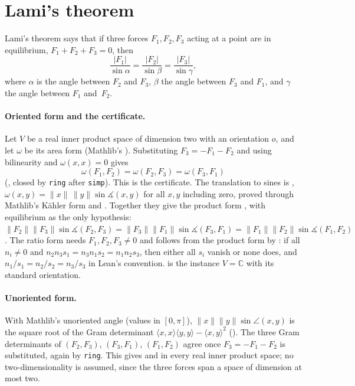 \documentclass[11pt]{article}
\theoremstyle{definition}
\theoremstyle{remark}
\newcommand{\lean}[1]{\texttt{#1}}
\newcommand{\CC}{\mathbb{C}}
\begin{document}
\section{Lami's theorem}\label{sec:lami}

Lami's theorem says that if three forces $F_1,F_2,F_3$ acting at a point are in equilibrium,
$F_1+F_2+F_3=0$, then
\[
\frac{|F_1|}{\sin\alpha}=\frac{|F_2|}{\sin\beta}=\frac{|F_3|}{\sin\gamma},
\]
where $\alpha$ is the angle between $F_2$ and $F_3$, $\beta$ the angle between $F_3$ and $F_1$, and
$\gamma$ the angle between $F_1$ and~$F_2$.

\paragraph{Oriented form and the certificate.} Let $V$ be a real inner product space of dimension
two with an orientation $o$, and let $\omega$ be its area form (Mathlib's
). Substituting $F_3=-F_1-F_2$ and using bilinearity and
$\omega(x,x)=0$ gives
\begin{equation}\label{eq:lami}
\omega(F_1,F_2)=\omega(F_2,F_3)=\omega(F_3,F_1)
\end{equation}
(, closed by \lean{ring} after \lean{simp}). This is the certificate.
The translation to sines is ,
$\omega(x,y)=\|x\|\,\|y\|\sin\measuredangle(x,y)$ for all $x,y$ including zero, proved through
Mathlib's K\"ahler form and . Together they give the product form
, with equilibrium as the only hypothesis:
$\|F_2\|\|F_3\|\sin\measuredangle(F_2,F_3)=\|F_3\|\|F_1\|\sin\measuredangle(F_3,F_1)=\|F_1\|\|F_2\|\sin\measuredangle(F_1,F_2)$.
The ratio form  needs $F_1,F_2,F_3\ne0$ and follows from the product
form by : if all $n_i\ne0$ and
$n_2n_3s_1=n_3n_1s_2=n_1n_2s_3$, then either all $s_i$ vanish or none does, and
$n_1/s_1=n_2/s_2=n_3/s_3$ in Lean's convention.  is the instance
$V=\CC$ with its standard orientation.

\paragraph{Unoriented form.} With Mathlib's unoriented angle 
(values in $[0,\pi]$), $\|x\|\|y\|\sin\angle(x,y)$ is the square root of the Gram determinant
$\langle x,x\rangle\langle y,y\rangle-\langle x,y\rangle^2$
(). The three Gram determinants of $(F_2,F_3)$,
$(F_3,F_1)$, $(F_1,F_2)$ agree once $F_3=-F_1-F_2$ is substituted, again by \lean{ring}. This
gives  and  in every real inner product space; no
two-dimensionality is assumed, since the three forces span a space of dimension at most two.
\end{document}
